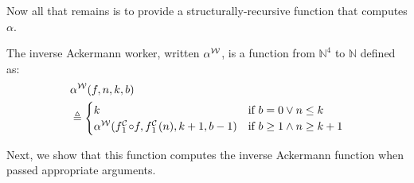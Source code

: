 Now all that remains is to provide a structurally-recursive function that computes $\alpha$.
\begin{defn} \label{defn: inv-ack-worker}
	The inverse Ackermann worker, written $\alpha^{\mathcal{W}}$, is a function from $\mathbb{N}^4$ to $\mathbb{N}$ defined as: %
	\begin{equation} \label{eq: inv-ack-worker-recursion}
	\begin{aligned}
	& \alpha^{\W}(f, n, k, b) \\
	& \triangleq \begin{cases}
	k & \text{if } b = 0 \vee n\le k \\ \alpha^{\W}(\cdt{f}{1}\circ f , \cdt{f}{1}(n), k+1, b-1) & \text{if } b \ge 1 \wedge n \ge k+1
	\end{cases}
		\end{aligned}
	\end{equation}
\end{defn}
\noindent Next, we show that this function computes the inverse Ackermann function when passed appropriate arguments.
